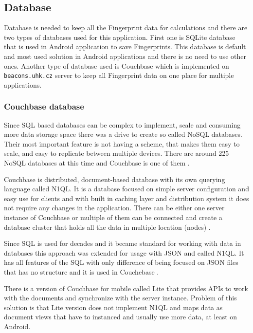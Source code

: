 \subsection{Database}\label{subsec:Database}
Database is needed to keep all the Fingerprint data for calculations and there are two types of databases used for this application. First one is SQLite database that is used in Android application to save Fingerprints. This database is default and most used solution in Android applications and there is no need to use other ones. Another type of database used is Couchbase which is implemented on \verb|beacons.uhk.cz| server to keep all Fingerprint data on one place for multiple applications.

\subsubsection{Couchbase database}\label{subsec:CouchbaseDatabase}
Since SQL based databases can be complex to implement, scale and consuming more data storage space there was a drive to create so called NoSQL databases. Their most important feature is not having a scheme, that makes them easy to scale, and easy to replicate between multiple devices. There are around 225 NoSQL databases at this time and Couchbase is one of them \cite{NOSQLDB}.

Couchbase is distributed, document-based database with its own querying language called N1QL. It is a database focused on simple server configuration and easy use for clients and with built in caching layer and distribution system it does not require any changes in the application. There can be either one server instance of Couchbase or multiple of them can be connected and create a database cluster that holds all the data in multiple location (nodes) \cite{GSWCBS}.

Since SQL is used for decades and it became standard for working with data in databases this approach was extended for usage with JSON and called N1QL. It has all features of the SQL with only difference of being focused on JSON files that has no structure and it is used in Couchebase \cite{WINQL}.

There is a version of Couchbase for mobile called Lite that provides APIs to work with the documents and synchronize with the server instance. Problem of this solution is that Lite version does not implement N1QL and maps data as document views that have to instanced and usually use more data, at least on Android. 


